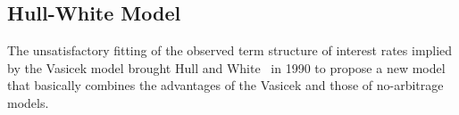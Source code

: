 %
%
%
%
%
%
%
%
%
%

\subsection{Hull-White Model}
\label{hull-white-model}
The unsatisfactory fitting of the observed term structure of interest rates implied by the Vasicek model brought Hull and White~\cite{bib:hull_white_model} in 1990 to propose a new model that basically combines the advantages of the Vasicek and those of no-arbitrage models.

